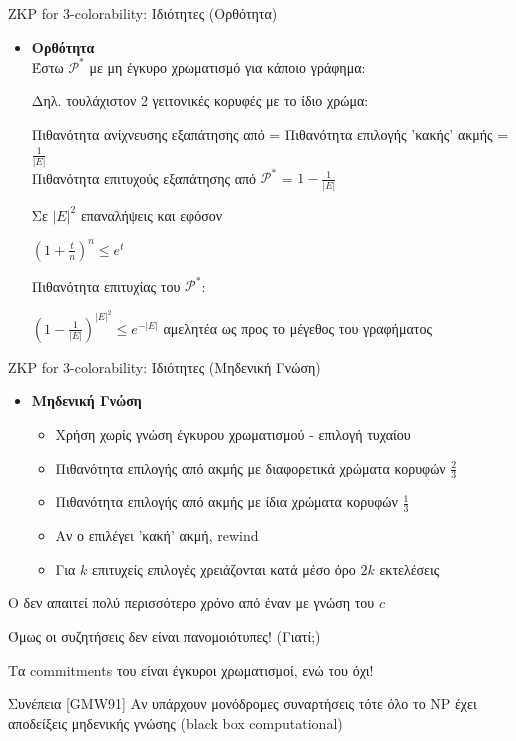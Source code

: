 \documentclass[handout]{beamer}
\begin{document}
\begin{frame}{ZKP for 3-colorability: Ιδιότητες (Ορθότητα)} 
\begin{itemize}
\item \textbf{Ορθότητα}\\
Έστω $\mathcal{P}^*$ με μη έγκυρο χρωματισμό για κάποιο γράφημα:

Δηλ. \alert{τουλάχιστον 2 γειτονικές κορυφές με το ίδιο χρώμα}:
\pause

Πιθανότητα ανίχνευσης εξαπάτησης από \ver = Πιθανότητα επιλογής 'κακής' ακμής = $\frac{1}{|E|}$  \\

Πιθανότητα επιτυχούς εξαπάτησης από $\mathcal{P}^*$ = $1-\frac{1}{|E|}$
\pause

Σε $|E|^2$ επαναλήψεις και εφόσον
\begin{center}
$(1+\frac{t}{n})^n \leq e^t$
\end{center}

\medskip
Πιθανότητα επιτυχίας του  $\mathcal{P}^*$:

\begin{center}
$(1-\frac{1}{|E|})^{|E|^2} \leq e^{-|E|}$ \alert{αμελητέα} ως προς το μέγεθος του γραφήματος
\end{center}

\end{itemize}
\end{frame}

\begin{frame}{ZKP for 3-colorability: Ιδιότητες (Μηδενική Γνώση)} 
\begin{itemize}
\item \textbf{Μηδενική Γνώση} 
\begin{itemize}
\item Χρήση \siml χωρίς γνώση έγκυρου χρωματισμού - επιλογή τυχαίου

\item Πιθανότητα επιλογής από \ver ακμής με διαφορετικά χρώματα κορυφών $\frac{2}{3}$
\item Πιθανότητα επιλογής από \ver ακμής με ίδια χρώματα κορυφών  $\frac{1}{3}$
\item Αν ο \ver επιλέγει 'κακή' ακμή, rewind

\item Για $k$ επιτυχείς επιλογές χρειάζονται κατά μέσο όρο $2k$ εκτελέσεις

\end{itemize}
\end{itemize}
\pause
\begin{small}
Ο \siml δεν απαιτεί πολύ περισσότερο χρόνο από έναν \prv με γνώση του $c$

\alert{Όμως οι συζητήσεις δεν είναι πανομοιότυπες! (Γιατί;)}

\pause 
Τα commitments του \prv είναι έγκυροι χρωματισμοί, ενώ του \siml όχι!
\pause
\begin{block}{Συνέπεια [GMW91]}
Αν υπάρχουν μονόδρομες συναρτήσεις τότε όλο το NP έχει αποδείξεις μηδενικής γνώσης (black box computational)
\end{block}
\end{small}
\end{frame}
\end{document}
